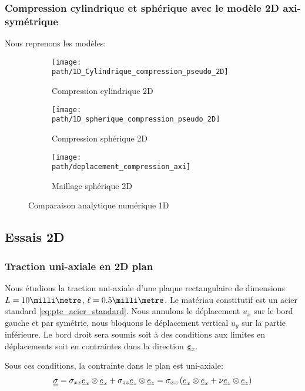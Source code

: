 \documentclass[10pt]{book}
\def\path{./fig}
\begin{document}
\subsubsection{Compression cylindrique et sphérique avec le modèle 2D axi-symétrique}
Nous reprenons les modèles:
\begin{figure}[h!]
\begin{subfigure}[b]{0.35\textwidth}
\centering \texttt{[image: \\path/1D\_Cylindrique\_compression\_pseudo\_2D]}
\caption{Compression cylindrique 2D}
\label{fig:1D_Cylindrique_compression_pseudo_2D}
\end{subfigure}\hfill
\begin{subfigure}[b]{0.35\textwidth}
\centering \texttt{[image: \\path/1D\_spherique\_compression\_pseudo\_2D]}
\caption{Compression sphérique 2D}
\label{fig:1D_spherique_compression_pseudo_2D}
\end{subfigure}
\begin{subfigure}[b]{0.28\textwidth}
\centering \texttt{[image: \\path/deplacement\_compression\_axi]}
\caption{Maillage sphérique 2D}
\label{fig:deplacement_compression_axi}
\end{subfigure}
\caption{Comparaison analytique numérique 1D}
\end{figure}
\subsection{Essais 2D}
\subsubsection{Traction uni-axiale en 2D plan}
Nous étudions la traction uni-axiale d'une plaque rectangulaire de dimensions $L=10\milli\metre$, $\ell = 0.5 \milli\metre$. Le matériau constitutif est un acier standard \eqref{eq:pte_acier_standard}. Nous annulons le déplacement $u_{x}$ sur le bord gauche et par symétrie, nous bloquons le déplacement vertical $u_{y}$ sur la partie inférieure. Le bord droit sera soumis soit à des conditions aux limites en déplacements soit en contraintes dans la direction $\underline{e}_{x}$.

Sous ces conditions, la contrainte dans le plan est uni-axiale:
$$\underline{\underline{\sigma}} = \sigma_{xx}\underline{e}_{x}\otimes\underline{e}_{x}+\sigma_{zz}\underline{e}_{z}\otimes\underline{e}_{z}=\sigma_{xx}\left(\underline{e}_{x}\otimes\underline{e}_{x}+\nu\underline{e}_{z}\otimes\underline{e}_{z}\right)$$
\end{document}
